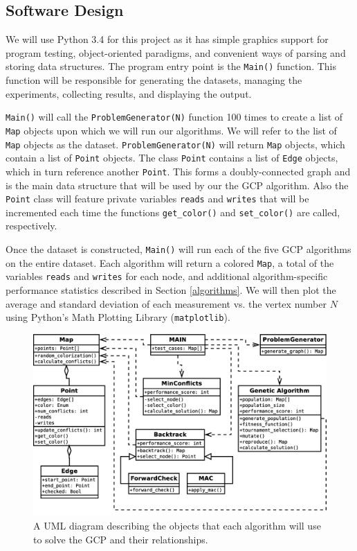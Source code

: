 \documentclass{article}
\begin{document}
\begin{multicols}{2}
\section{Software Design}
We will use Python 3.4 for this project as it has simple graphics support for program testing, object-oriented paradigms, and convenient ways of parsing and storing data structures. The program entry point is the \texttt{Main()} function. This function will be responsible for generating the datasets, managing the experiments, collecting results, and displaying the output. \par
\texttt{Main()} will call the \texttt{ProblemGenerator(N)} function 100 times to create a list of \texttt{Map} objects upon which we will run our algorithms. We will refer to the list of \texttt{Map} objects as the dataset. \texttt{ProblemGenerator(N)} will return \texttt{Map} objects, which contain a list of \texttt{Point} objects. The class \texttt{Point} contains a list of \texttt{Edge} objects, which in turn reference another \texttt{Point}. This forms a doubly-connected graph and is the main data structure that will be used by our the GCP algorithm. Also the \texttt{Point} class will feature private variables \texttt{reads} and \texttt{writes} that will be incremented each time the functions \texttt{get\_color()} and \texttt{set\_color()} are called, respectively. \par 
Once the dataset is constructed, \texttt{Main()} will run each of the five GCP algorithms on the entire dataset. Each algorithm will return a colored \texttt{Map}, a total of the variables \texttt{reads} and \texttt{writes} for each node, and additional algorithm-specific performance statistics described in Section \ref{algorithms}. We will then plot the average and standard deviation of each measurement vs. the vertex number $N$ using Python's Math Plotting Library (\texttt{matplotlib}).
\begin{figure}[H]
	\centering
	\includegraphics[width=\linewidth]{images/AI_UML_Project_1}
	\caption{A UML diagram describing the objects that each algorithm will use to solve the GCP and their relationships.}
	\label{uml}
\end{figure}

\end{multicols}
\end{document}
